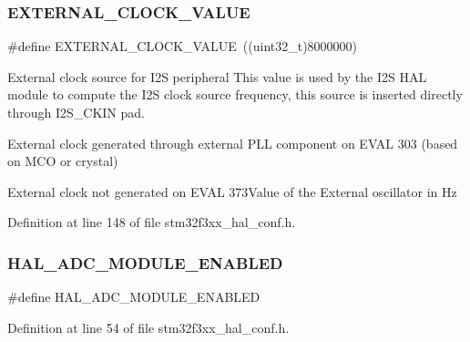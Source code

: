 \subsubsection{E\+X\+T\+E\+R\+N\+A\+L\+\_\+\+C\+L\+O\+C\+K\+\_\+\+V\+A\+L\+UE}
{\footnotesize\ttfamily \#define E\+X\+T\+E\+R\+N\+A\+L\+\_\+\+C\+L\+O\+C\+K\+\_\+\+V\+A\+L\+UE~((uint32\+\_\+t)8000000)}



External clock source for I2S peripheral This value is used by the I2S H\+AL module to compute the I2S clock source frequency, this source is inserted directly through I2\+S\+\_\+\+C\+K\+IN pad. 


\begin{DoxyItemize}
\item External clock generated through external P\+LL component on E\+V\+AL 303 (based on M\+CO or crystal)
\item External clock not generated on E\+V\+AL 373\+Value of the External oscillator in Hz 
\end{DoxyItemize}

Definition at line 148 of file stm32f3xx\+\_\+hal\+\_\+conf.\+h.

\mbox{\label{stm32f3xx__hal__conf_8h_a476f1655c969ae57e89a74d98c75f43f}} 
\subsubsection{H\+A\+L\+\_\+\+A\+D\+C\+\_\+\+M\+O\+D\+U\+L\+E\+\_\+\+E\+N\+A\+B\+L\+ED}
{\footnotesize\ttfamily \#define H\+A\+L\+\_\+\+A\+D\+C\+\_\+\+M\+O\+D\+U\+L\+E\+\_\+\+E\+N\+A\+B\+L\+ED}



Definition at line 54 of file stm32f3xx\+\_\+hal\+\_\+conf.\+h.

\mbox{\label{stm32f3xx__hal__conf_8h_ad6ee4556883fa38d3a2c26d9a624a109}} 
